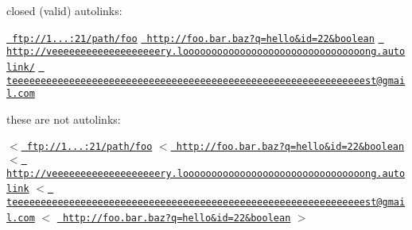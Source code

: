 closed (valid) autolinks\+:

\href{ftp://1.2.3.4:21/path/foo}{\texttt{ ftp\+://1...\+:21/path/foo}} \href{http://foo.bar.baz?q=hello&id=22&boolean}{\texttt{ http\+://foo.\+bar.\+baz?q=hello\&id=22\&boolean}} \href{http://veeeeeeeeeeeeeeeeeeery.loooooooooooooooooooooooooooooooong.autolink/}{\texttt{ http\+://veeeeeeeeeeeeeeeeeeery.\+loooooooooooooooooooooooooooooooong.\+autolink/}} \href{mailto:teeeeeeeeeeeeeeeeeeeeeeeeeeeeeeeeeeeeeeeeeeeeeeeeeeeeeeeeeeeeeest@gmail.com}{\texttt{ teeeeeeeeeeeeeeeeeeeeeeeeeeeeeeeeeeeeeeeeeeeeeeeeeeeeeeeeeeeeeest@gmail.\+com}}

these are not autolinks\+:

\texorpdfstring{$<$}{<}\href{ftp://1.2.3.4:21/path/foo}{\texttt{ ftp\+://1...\+:21/path/foo}} \texorpdfstring{$<$}{<}\href{http://foo.bar.baz?q=hello&id=22&boolean}{\texttt{ http\+://foo.\+bar.\+baz?q=hello\&id=22\&boolean}} \texorpdfstring{$<$}{<}\href{http://veeeeeeeeeeeeeeeeeeery.loooooooooooooooooooooooooooooooong.autolink}{\texttt{ http\+://veeeeeeeeeeeeeeeeeeery.\+loooooooooooooooooooooooooooooooong.\+autolink}} \texorpdfstring{$<$}{<}\href{mailto:teeeeeeeeeeeeeeeeeeeeeeeeeeeeeeeeeeeeeeeeeeeeeeeeeeeeeeeeeeeeeest@gmail.com}{\texttt{ teeeeeeeeeeeeeeeeeeeeeeeeeeeeeeeeeeeeeeeeeeeeeeeeeeeeeeeeeeeeeest@gmail.\+com}} \texorpdfstring{$<$}{<} \href{http://foo.bar.baz?q=hello&id=22&boolean}{\texttt{ http\+://foo.\+bar.\+baz?q=hello\&id=22\&boolean}} \texorpdfstring{$>$}{>} 